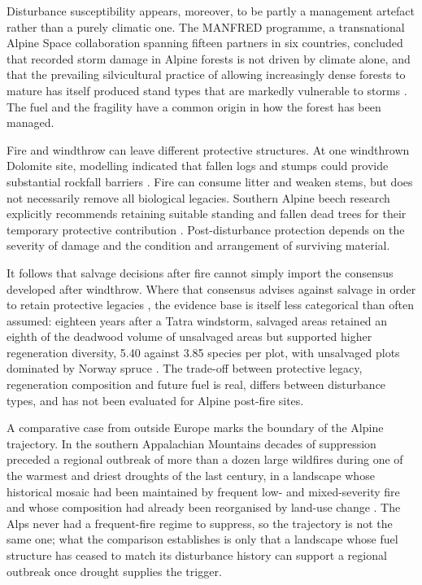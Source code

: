\documentclass[11pt,a4paper]{article}
\begin{document}
Disturbance susceptibility appears, moreover, to be partly a management artefact rather than a purely climatic one. The MANFRED programme, a transnational Alpine Space collaboration spanning fifteen partners in six countries, concluded that recorded storm damage in Alpine forests is not driven by climate alone, and that the prevailing silvicultural practice of allowing increasingly dense forests to mature has itself produced stand types that are markedly vulnerable to storms \citep{jandl_management_2013}. The fuel and the fragility have a common origin in how the forest has been managed.

Fire and windthrow can leave different protective structures. At one windthrown Dolomite site, modelling indicated that fallen logs and stumps could provide substantial rockfall barriers \citep{costa_biological_2021}. Fire can consume litter and weaken stems, but does not necessarily remove all biological legacies. Southern Alpine beech research explicitly recommends retaining suitable standing and fallen dead trees for their temporary protective contribution \citep{maringer_temporal_2016}. Post-disturbance protection depends on the severity of damage and the condition and arrangement of surviving material.

It follows that salvage decisions after fire cannot simply import the consensus developed after windthrow. Where that consensus advises against salvage in order to retain protective legacies \citep{costa_biological_2021}, the evidence base is itself less categorical than often assumed: eighteen years after a Tatra windstorm, salvaged areas retained an eighth of the deadwood volume of unsalvaged areas but supported higher regeneration diversity, 5.40 against 3.85 species per plot, with unsalvaged plots dominated by Norway spruce \citep{seben_impact_2024}. The trade-off between protective legacy, regeneration composition and future fuel is real, differs between disturbance types, and has not been evaluated for Alpine post-fire sites.

A comparative case from outside Europe marks the boundary of the Alpine trajectory. In the southern Appalachian Mountains decades of suppression preceded a regional outbreak of more than a dozen large wildfires during one of the warmest and driest droughts of the last century, in a landscape whose historical mosaic had been maintained by frequent low- and mixed-severity fire and whose composition had already been reorganised by land-use change \citep{reilly_drivers_2022}. The Alps never had a frequent-fire regime to suppress, so the trajectory is not the same one; what the comparison establishes is only that a landscape whose fuel structure has ceased to match its disturbance history can support a regional outbreak once drought supplies the trigger.
\end{document}
